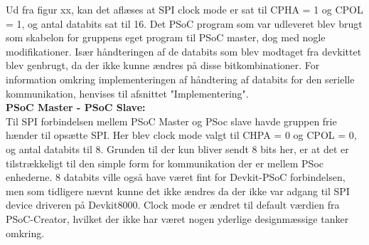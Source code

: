 Ud fra figur xx, kan det aflæses at SPI clock mode er sat til CPHA = 1 og CPOL = 1, og antal databits sat til 16. Det PSoC program som var udleveret blev brugt
som skabelon for gruppens eget program til PSoC master, dog med nogle modifikationer. Især håndteringen af de databits som blev modtaget fra devkittet blev 
genbrugt, da der ikke kunne ændres på disse bitkombinationer. For information omkring implementeringen af håndtering af databits for den serielle kommunikation, 
henvises til afsnittet "Implementering". \\

\textbf{PSoC Master - PSoC Slave:} \\

Til SPI forbindelsen mellem PSoC Master og PSoc slave havde gruppen frie hænder til opsætte SPI. Her blev clock mode valgt til CHPA = 0 og CPOL = 0, og 
antal databits til 8. Grunden til der kun bliver sendt 8 bits her, er at det er tilstrækkeligt til den simple form for kommunikation der er mellem PSoc enhederne.
8 databits ville også have været fint for Devkit-PSoC forbindelsen, men som tidligere nævnt kunne det ikke ændres da der ikke var adgang til SPI device driveren
på Devkit8000. Clock mode er ændret til default værdien fra PSoC-Creator, hvilket der ikke har været nogen yderlige designmæssige tanker omkring. 

